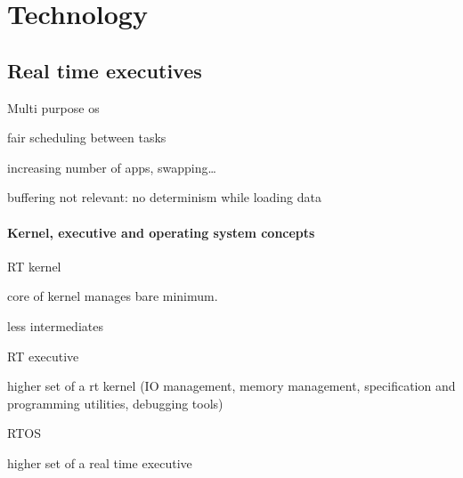 \documentclass[10pt]{article}
\theoremstyle{plain}
\theoremstyle{definition}
\theoremstyle{remark}
\begin{document}
\section{Technology}

\subsection{Real time executives}
Multi purpose os
\begin{compactitem}
	\item fair scheduling between tasks
	\item increasing number of apps, swapping\dots
	\item buffering not relevant: no determinism while loading data
\end{compactitem}

\paragraph{Kernel, executive and operating system concepts}
\begin{compactitem}
	\item RT kernel
		\begin{compactitem}
			\item core of kernel manages bare minimum.
			\item less intermediates
		\end{compactitem}
	\item RT executive
		\begin{compactitem}
			\item higher set of a rt kernel (IO management, memory management,
				specification and programming utilities, debugging tools)
		\end{compactitem}
	\item RTOS
		\begin{compactitem}
			\item higher set of a real time executive
		\end{compactitem}
\end{compactitem}
\end{document}
